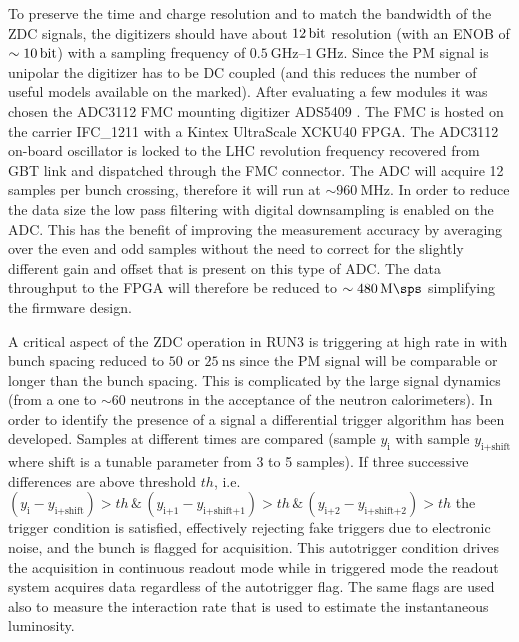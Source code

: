 To preserve the time and charge resolution 
and to match the bandwidth of the ZDC signals, the digitizers should have about $\SI{12}{\bit}$ resolution (with an ENOB of $\sim\SI{10}{\bit}$) with a sampling frequency of
$\SIrange[range-units=single,range-phrase=\div]{0.5}{1}{\giga\hertz}$. Since the PM signal is unipolar the digitizer has to be DC coupled (and this reduces the number of useful models available on the marked). After evaluating a few modules it was chosen the ADC3112 FMC \cite{IOXOSADC3112} mounting digitizer ADS5409 \cite{TIADS5409}. The FMC is hosted on the carrier IFC\_1211 \cite{IOXOSIFC1211} with a Kintex UltraScale XCKU40 FPGA. The ADC3112 on-board oscillator is locked to the LHC revolution frequency recovered from GBT link and dispatched through the FMC connector. The ADC will acquire 12 samples per bunch crossing, therefore it will run at
$\sim\SI{960}{\mega\hertz}$. In order to reduce the data size the low pass filtering with digital downsampling is enabled on the ADC. This has the benefit of improving the measurement accuracy by averaging over the even and odd samples without the need to correct for the slightly different gain and offset that is present on this type of ADC. The data throughput to the FPGA will therefore be reduced to $\sim\SI{480}{\mega\sps}$ simplifying the firmware design.

A critical aspect of the ZDC operation in RUN3 is triggering at high rate in \PbPb with bunch spacing reduced to $\si{50}$ or $\SI{25}{\nano\second}$ since the PM signal will be comparable or longer than the bunch spacing. This is complicated by the large signal dynamics (from a one to $\sim60$ neutrons in the acceptance of the neutron calorimeters). In order to identify the presence of a signal a differential trigger algorithm has been developed. Samples at different times are compared (sample $y_{\textrm{i}}$ with sample $y_{\textrm{i+shift}}$ where $\textrm{shift}$ is a tunable parameter from 3 to 5 samples). If three successive differences are above threshold $th$, i.e. $\left(y_{\textrm{i}}-y_{\textrm{i+shift}}\right)>th\,\&\,\left(y_{\textrm{i+1}}-y_{\textrm{i+shift+1}}\right)>th\,\&\,\left(y_{\textrm{i+2}}-y_{\textrm{i+shift+2}}\right)>th$ 
the trigger condition is satisfied, effectively rejecting fake triggers due to electronic noise, and the bunch is flagged for acquisition. This autotrigger condition drives the acquisition in continuous readout mode while in triggered mode the readout system acquires data regardless of the autotrigger flag. The same flags are used also to measure the interaction rate that is used to estimate the instantaneous luminosity.

